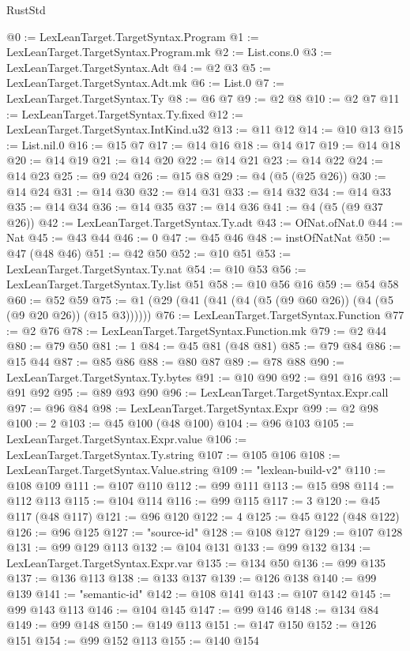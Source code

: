 \begin{lexlean}{RustStd}
\begin{coremodule}
@0 := LexLeanTarget.TargetSyntax.Program
@1 := LexLeanTarget.TargetSyntax.Program.mk
@2 := List.cons.{0}
@3 := LexLeanTarget.TargetSyntax.Adt
@4 := @2 @3
@5 := LexLeanTarget.TargetSyntax.Adt.mk
@6 := List.{0}
@7 := LexLeanTarget.TargetSyntax.Ty
@8 := @6 @7
@9 := @2 @8
@10 := @2 @7
@11 := LexLeanTarget.TargetSyntax.Ty.fixed
@12 := LexLeanTarget.TargetSyntax.IntKind.u32
@13 := @11 @12
@14 := @10 @13
@15 := List.nil.{0}
@16 := @15 @7
@17 := @14 @16
@18 := @14 @17
@19 := @14 @18
@20 := @14 @19
@21 := @14 @20
@22 := @14 @21
@23 := @14 @22
@24 := @14 @23
@25 := @9 @24
@26 := @15 @8
@29 := @4 (@5 (@25 @26))
@30 := @14 @24
@31 := @14 @30
@32 := @14 @31
@33 := @14 @32
@34 := @14 @33
@35 := @14 @34
@36 := @14 @35
@37 := @14 @36
@41 := @4 (@5 (@9 @37 @26))
@42 := LexLeanTarget.TargetSyntax.Ty.adt
@43 := OfNat.ofNat.{0}
@44 := Nat
@45 := @43 @44
@46 := 0
@47 := @45 @46
@48 := instOfNatNat
@50 := @47 (@48 @46)
@51 := @42 @50
@52 := @10 @51
@53 := LexLeanTarget.TargetSyntax.Ty.nat
@54 := @10 @53
@56 := LexLeanTarget.TargetSyntax.Ty.list @51
@58 := @10 @56 @16
@59 := @54 @58
@60 := @52 @59
@75 := @1 (@29 (@41 (@41 (@4 (@5 (@9 @60 @26)) (@4 (@5 (@9 @20 @26)) (@15 @3))))))
@76 := LexLeanTarget.TargetSyntax.Function
@77 := @2 @76
@78 := LexLeanTarget.TargetSyntax.Function.mk
@79 := @2 @44
@80 := @79 @50
@81 := 1
@84 := @45 @81 (@48 @81)
@85 := @79 @84
@86 := @15 @44
@87 := @85 @86
@88 := @80 @87
@89 := @78 @88
@90 := LexLeanTarget.TargetSyntax.Ty.bytes
@91 := @10 @90
@92 := @91 @16
@93 := @91 @92
@95 := @89 @93 @90
@96 := LexLeanTarget.TargetSyntax.Expr.call
@97 := @96 @84
@98 := LexLeanTarget.TargetSyntax.Expr
@99 := @2 @98
@100 := 2
@103 := @45 @100 (@48 @100)
@104 := @96 @103
@105 := LexLeanTarget.TargetSyntax.Expr.value
@106 := LexLeanTarget.TargetSyntax.Ty.string
@107 := @105 @106
@108 := LexLeanTarget.TargetSyntax.Value.string
@109 := "lexlean-build-v2"
@110 := @108 @109
@111 := @107 @110
@112 := @99 @111
@113 := @15 @98
@114 := @112 @113
@115 := @104 @114
@116 := @99 @115
@117 := 3
@120 := @45 @117 (@48 @117)
@121 := @96 @120
@122 := 4
@125 := @45 @122 (@48 @122)
@126 := @96 @125
@127 := "source-id"
@128 := @108 @127
@129 := @107 @128
@131 := @99 @129 @113
@132 := @104 @131
@133 := @99 @132
@134 := LexLeanTarget.TargetSyntax.Expr.var
@135 := @134 @50
@136 := @99 @135
@137 := @136 @113
@138 := @133 @137
@139 := @126 @138
@140 := @99 @139
@141 := "semantic-id"
@142 := @108 @141
@143 := @107 @142
@145 := @99 @143 @113
@146 := @104 @145
@147 := @99 @146
@148 := @134 @84
@149 := @99 @148
@150 := @149 @113
@151 := @147 @150
@152 := @126 @151
@154 := @99 @152 @113
@155 := @140 @154

\end{coremodule}
\end{lexlean}
